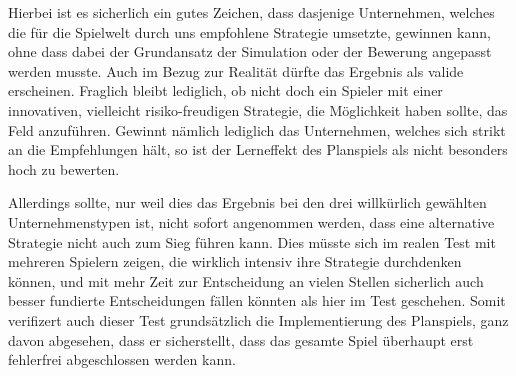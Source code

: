 Hierbei ist es sicherlich ein gutes Zeichen, dass dasjenige Unternehmen, welches die für die Spielwelt durch uns empfohlene Strategie umsetzte, gewinnen kann, ohne dass dabei der Grundansatz der Simulation oder der Bewerung angepasst werden musste. Auch im Bezug zur Realität dürfte das Ergebnis als valide erscheinen. Fraglich bleibt lediglich, ob nicht doch ein Spieler mit einer innovativen, vielleicht risiko-freudigen Strategie, die Möglichkeit haben sollte, das Feld anzuführen. Gewinnt nämlich lediglich das Unternehmen, welches sich strikt an die Empfehlungen hält, so ist der Lerneffekt des Planspiels als nicht besonders hoch zu bewerten.

Allerdings sollte, nur weil dies das Ergebnis bei den drei willkürlich gewählten Unternehmenstypen ist, nicht sofort angenommen werden, dass eine alternative Strategie nicht auch zum Sieg führen kann. Dies müsste sich im realen Test mit mehreren Spielern zeigen, die wirklich intensiv ihre Strategie durchdenken können, und mit mehr Zeit zur Entscheidung an vielen Stellen sicherlich auch besser fundierte Entscheidungen fällen könnten als hier im Test geschehen. Somit verifizert auch dieser Test grundsätzlich die Implementierung des Planspiels, ganz davon abgesehen, dass er sicherstellt, dass das gesamte Spiel überhaupt erst fehlerfrei abgeschlossen werden kann.

\autorende{}